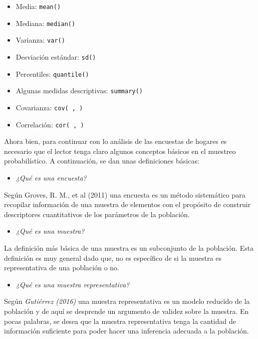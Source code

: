 \documentclass[
  12pt,
]{book}
\providecommand{\tightlist}{%
  \setlength{\itemsep}{0pt}\setlength{\parskip}{0pt}}
\begin{document}
\begin{itemize}
\tightlist
\item
  Media: \texttt{mean()}
\item
  Mediana: \texttt{median()}
\item
  Varianza: \texttt{var()}
\item
  Desviación estándar: \texttt{sd()}
\item
  Percentiles: \texttt{quantile()}
\item
  Algunas medidas descriptivas: \texttt{summary()}
\item
  Covarianza: \texttt{cov(\ ,\ )}
\item
  Correlación: \texttt{cor(\ ,\ )}
\end{itemize}

Ahora bien, para continuar con lo análisis de las encuestas de hogares es necesario que el lector tenga claro algunos conceptos básicos en el muestreo probabilístico. A continuación, se dan unas definiciones básicas:

\begin{itemize}
\tightlist
\item
  \emph{¿Qué es una encuesta?}
\end{itemize}

Según Groves, R. M., et al (2011) una encuesta es un método sistemático para recopilar información de una muestra de elementos con el propósito de construir descriptores cuantitativos de los parámetros de la población.

\begin{itemize}
\tightlist
\item
  \emph{¿Qué es una muestra?}
\end{itemize}

La definición más básica de una muestra es un subconjunto de la población. Esta definición es muy general dado que, no es específico de si la muestra es representativa de una población o no.

\begin{itemize}
\tightlist
\item
  \emph{¿Qué es una muestra representativa?}
\end{itemize}

Según \emph{Gutiérrez (2016)} una muestra representativa es un modelo reducido de la población y de aquí se desprende un argumento de validez sobre la muestra. En pocas palabras, se desea que la muestra representativa tenga la cantidad de información suficiente para poder hacer una inferencia adecuada a la población.
\end{document}

